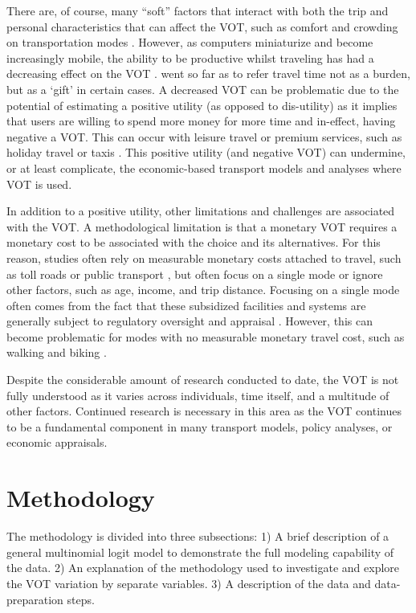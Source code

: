 \documentclass[numbered]{trbunofficial}\usepackage[]{graphicx}\usepackage[]{color}
\begin{document}
There are, of course, many ``soft'' factors that interact with both the trip and personal characteristics that can affect the VOT, such as comfort and crowding on transportation modes \citep{Wardman2011,Kroes2014,Kouwenhoven2018}. However, as computers miniaturize and become increasingly mobile, the ability to be productive whilst traveling has had a decreasing effect on the VOT \citep{Lyons2005,Wardman2016,Malokin2017,Kouwenhoven2018}. \citet{Jain2008} went so far as to refer travel time not as a burden, but as a `gift' in certain cases. A decreased VOT can be problematic due to the potential of estimating a positive utility (as opposed to dis-utility) as it implies that users are willing to spend more money for more time and in-effect, having negative a VOT. This can occur with leisure travel or premium services, such as holiday travel or taxis \citep{Jain2008,Jara-Diaz2008,Fezzi2014}. This positive utility (and negative VOT) can undermine, or at least complicate, the economic-based transport models and analyses where VOT is used. 

In addition to a positive utility, other limitations and challenges are associated with the VOT. A methodological limitation is that a monetary VOT requires a monetary cost to be associated with the choice and its alternatives. For this reason, studies often rely on measurable monetary costs attached to travel, such as toll roads or public transport \citep{Li2012,Wardman2004}, but often focus on a single mode or ignore other factors, such as age, income, and trip distance. Focusing on a single mode often comes from the fact that these subsidized facilities and systems are generally subject to regulatory oversight and appraisal \citep{Wardman2001}. However, this can become problematic for modes with no measurable monetary travel cost, such as walking and biking \citep{Wichman2017}. 

Despite the considerable amount of research conducted to date, the VOT is not fully understood as it varies across individuals, time itself, and a multitude of other factors. Continued research is necessary in this area as the VOT continues to be a fundamental component in many transport models, policy analyses, or economic appraisals.


\section{Methodology}\label{sec:methods}

The methodology is divided into three subsections: 1) A brief description of a general multinomial logit model to demonstrate the full modeling capability of the data. 2) An explanation of the methodology used to investigate and explore the VOT variation by separate variables. 3) A description of the data and data-preparation steps.
\end{document}
